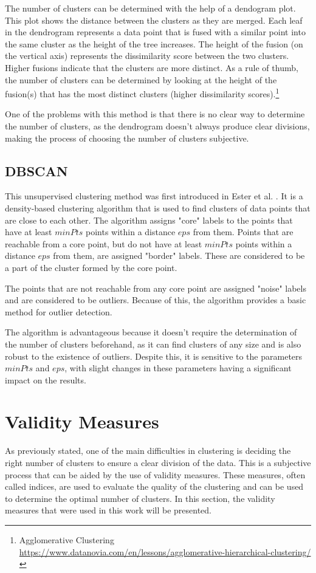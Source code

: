 The number of clusters can be determined with the help of a dendogram plot. This plot shows the distance between the clusters as they are merged. Each leaf in the dendrogram represents a data point that is fused with a similar point into the same cluster as the height of the tree increases. The height of the fusion (on the vertical axis) represents the dissimilarity score between the two clusters. Higher fusions indicate that the clusters are more distinct. As a rule of thumb, the number of clusters can be determined by looking at the height of the fusion(s) that has the most distinct clusters (higher dissimilarity scores).\footnote{Agglomerative Clustering \url{https://www.datanovia.com/en/lessons/agglomerative-hierarchical-clustering/}}

One of the problems with this method is that there is no clear way to determine the number of clusters, as the dendrogram doesn't always produce clear divisions, making the process of choosing the number of clusters subjective.

\subsection{DBSCAN}\label{sec:dbscan}
This unsupervised clustering method was first introduced in Ester et al. \cite{dbscan}. It is a density-based clustering algorithm that is used to find clusters of data points that are close to each other. The algorithm assigns "core" labels to the points that have at least $minPts$ points within a distance $eps$ from them. Points that are reachable from a core point, but do not have at least $minPts$ points within a distance $eps$ from them, are assigned "border" labels. These are considered to be a part of the cluster formed by the core point.

The points that are not reachable from any core point are assigned "noise" labels and are considered to be outliers. Because of this, the algorithm provides a basic method for outlier detection.

The algorithm is advantageous because it doesn't require the determination of the number of clusters beforehand, as it can find clusters of any size and is also robust to the existence of outliers. Despite this, it is sensitive to the parameters $minPts$ and $eps$, with slight changes in these parameters having a significant impact on the results.

\section{Validity Measures\label{sec:validity_measures}}
As previously stated, one of the main difficulties in clustering is deciding the right number of clusters to ensure a clear division of the data. This is a subjective process that can be aided by the use of validity measures. These measures, often called indices, are used to evaluate the quality of the clustering and can be used to determine the optimal number of clusters. In this section, the validity measures that were used in this work will be presented.

